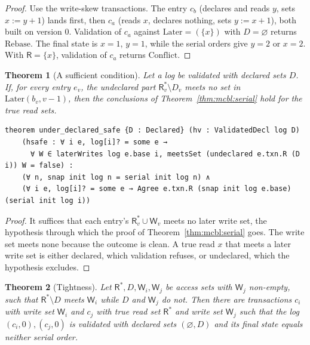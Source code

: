 \documentclass[11pt,letterpaper]{article}
\newtheorem{theorem}{Theorem}[section]
\theoremstyle{definition}
\theoremstyle{remark}
\newcommand{\R}{\mathsf{R}}
\newcommand{\W}{\mathsf{W}}
\newcommand{\Later}{\mathrm{Later}}
\newcommand{\Rb}{\mathrm{Rebase}}
\newcommand{\Cf}{\mathrm{Conflict}}
\begin{document}
\begin{proof}
Use the write-skew transactions. The entry $c_b$ (declares and reads $y$, sets $x:=y+1$) lands first, then $c_a$ (reads $x$, declares nothing, sets $y:=x+1$), both built on version 0. Validation of $c_a$ against $\Later=(\{x\})$ with $D=\varnothing$ returns $\Rb$. The final state is $x=1$, $y=1$, while the serial orders give $y=2$ or $x=2$. With $\R=\{x\}$, validation of $c_a$ returns $\Cf$.
\end{proof}

\begin{theorem}[A sufficient condition]
\label{thm:mcbl:udsafe}
Let a log be validated with declared sets $D$. If, for every entry $e_v$, the undeclared part $\R^{*}_v\setminus D_v$ meets no set in $\Later(b_v,v-1)$, then the conclusions of Theorem~\ref{thm:mcbl:serial} hold for the true read sets.
\end{theorem}

\begin{lstlisting}[language=Lean,caption={A sufficient condition (\texttt{YonedaTx/UnderDeclared.lean})},label={lst:mcbl:udsafe}]
theorem under_declared_safe {D : Declared} (hv : ValidatedDecl log D)
    (hsafe : ∀ i e, log[i]? = some e →
      ∀ W ∈ laterWrites log e.base i, meetsSet (undeclared e.txn.R (D i)) W = false) :
    (∀ n, snap init log n = serial init log n) ∧
    (∀ i e, log[i]? = some e → Agree e.txn.R (snap init log e.base) (serial init log i))
\end{lstlisting}

\begin{proof}
It suffices that each entry's $\R^{*}_v\cup\W_v$ meets no later write set, the hypothesis through which the proof of Theorem~\ref{thm:mcbl:serial} goes. The write set meets none because the outcome is clean. A true read $x$ that meets a later write set is either declared, which validation refuses, or undeclared, which the hypothesis excludes.
\end{proof}

\begin{theorem}[Tightness]
\label{thm:mcbl:udtight}
Let $\R^{*},D,\W_i,\W_j$ be access sets with $\W_j$ non-empty, such that $\R^{*}\setminus D$ meets $\W_i$ while $D$ and $\W_j$ do not. Then there are transactions $c_i$ with write set $\W_i$ and $c_j$ with true read set $\R^{*}$ and write set $\W_j$ such that the log $(c_i,0),(c_j,0)$ is validated with declared sets $(\varnothing,D)$ and its final state equals neither serial order.
\end{theorem}
\end{document}
